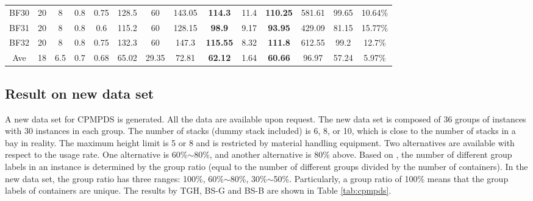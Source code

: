 \documentclass[review,3p,times,authoryear,12pt]{elsarticle}
\begin{document}
\begin{table}[!htb]
\begin{tabular}{c|c|c|c|c|c|c|c|c|c|c|c|c|c}
    BF30  & 20 & 8  & 0.8 & 0.75 & 128.5 & 60    & 143.05 &\textbf{ 114.3}& 11.4    & \textbf{110.25}& 581.61  & 99.65 & 10.64\%\\
    BF31  & 20 & 8  & 0.8 & 0.6  & 115.2 & 60    & 128.15 & \textbf{98.9} & 9.17    & \textbf{93.95} & 429.09  & 81.15 & 15.77\%\\
    BF32  & 20 & 8  & 0.8 & 0.75 & 132.3 & 60    & 147.3  & \textbf{115.55}& 8.32   & \textbf{111.8} & 612.55  & 99.2  & 12.7\%\\
    \hline
    Ave   & 18 & 6.5& 0.7 & 0.68 & 65.02 & 29.35 & 72.81  & \textbf{62.12}& 1.64    & \textbf{60.66} & 96.97   & 57.24 & 5.97\%\\
   \hline
\end{tabular}
\end{table}

\subsection {Result on new data set}

A new data set for CPMPDS is generated. All the data are available upon request. %
The new data set is composed of 36 groups of instances with 30 instances in each group.
The number of stacks (dummy stack included) is 6, 8, or 10, which is close to the number of stacks in a bay in reality.
The maximum height limit is 5 or 8 and is restricted by material handling equipment.
Two alternatives are available with respect to the usage rate. One alternative is 60\%$\sim$80\%, and another alternative is 80\% above.
Based on \cite{BF2012}, the number of different group labels in an instance is determined by the group ratio (equal to the number of different groups divided by the number of containers).
In the new data set, the group ratio has three ranges: 100\%, 60\%$\sim$80\%, 30\%$\sim$50\%.
Particularly, a group ratio of 100\% means that the group labels of containers are unique.
The results by TGH, BS-G and BS-B are shown in Table \ref{tab:cpmpds}.
\end{document}
